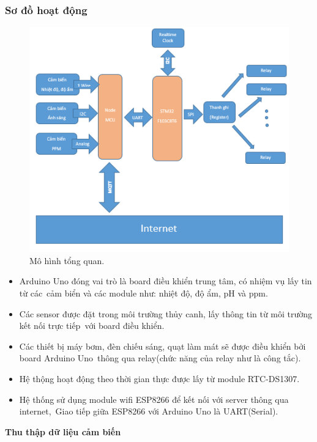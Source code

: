 \documentclass[a4paper,12pt,oneside]{article}
\begin{document}
\subsubsection{Sơ đồ hoạt động}
\begin{center}
\begin{figure}[h!]
\begin{center}
\includegraphics[scale=1]{hinh/mohinh.png}
\end{center}
\caption{Mô hình tổng quan.}
\end{figure}
\end{center}
\begin{itemize}
\item Arduino Uno đóng vai trò là board điều khiển trung tâm, có nhiệm vụ lấy tin từ các\
cảm biển và các module như: nhiệt độ, độ ẩm, pH và ppm.
\item Các sensor được đặt trong môi trường thủy canh, lấy thông tin từ môi trường kết nối trực tiếp\
với board điều khiển.
\item Các thiết bị máy bơm, đèn chiếu sáng, quạt làm mát sẽ được điều khiển bởi board Arduino Uno\
thông qua relay(chức năng của relay như là công tắc).
\item Hệ thộng hoạt động theo thời gian thực được lấy từ module RTC-DS1307.
\item Hệ thống sử dụng module wifi ESP8266 để kết nối với server thông qua internet,\
Giao tiếp giữa ESP8266 với Arduino Uno là UART(Serial).
\end{itemize}
\textbf{Thu thập dữ liệu cảm biến}\\
\end{document}
